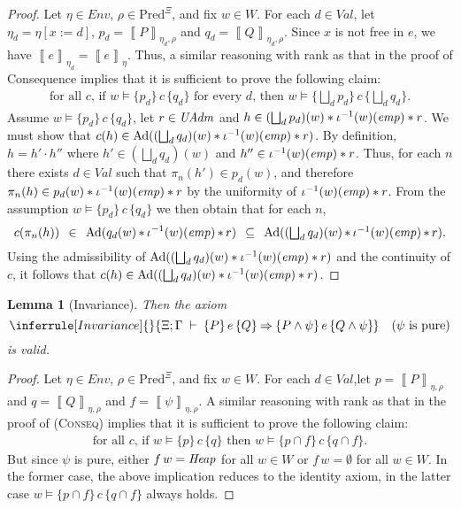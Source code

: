 \documentclass{LMCS}
\newtheorem{lemma}[theorem]{Lemma}
\theoremstyle{remark}
\newcommand{\Val}{\ensuremath{\mathit{Val}}\xspace}
\newcommand{\COMB}{\ensuremath{\cdot}}
\newcommand{\Env}{\ensuremath{\textit{Env}}\xspace}
\newcommand{\triple}[3]{{\ensuremath{\!\left.\{ #1 \}\, #2\, \{  #3 \}\!\right.}}}
\newcommand{\wemp}{\textnormal{\textit{emp}}}
\newcommand{\den}[1]{\left\llbracket #1
  \right\rrbracket}
\newcommand{\Pred}{\ensuremath{\mathrm{Pred}}\xspace}
\newcommand{\W}{\ensuremath{W}}
\newcommand{\UNFOLD}{\ensuremath{\iota^{-1}}}
\newcommand{\X}{\ensuremath{\Xi}}
\begin{document}
\begin{proof}
Let $\eta\in\Env$, $\rho\in\Pred^\X$, and fix $w\in\W$. 
For each $d\in\Val$, let $\eta_d = \eta[x{:=}d]$,  $p_d = \den{P}_{\eta_d,\rho}$ 
and $q_d = \den{Q}_{\eta_d,\rho}$.
Since $x$ is not free in $e$, we have 
$\den{e}_{\eta_d} = \den{e}_\eta$. Thus, a similar reasoning
with rank as that in the proof of Consequence implies that it is
sufficient to prove the following claim:
\begin{align*}
\textstyle{
\text{
for all $c$,
if $w\models\triple{p_d}{c}{q_d}$ for every $d$, then $w\models\triple{\bigsqcup_d p_d}{c}{\bigsqcup_d q_d}$} .
}
\end{align*}
Assume $w\models\triple{p_d}{c}{q_d}$, let $r\in\mathit{UAdm}$ and $h\in(\bigsqcup_d p_d)(w) * \UNFOLD(w)(\wemp) * r$. 
We must show that $c(h)\in\DCl( (\bigsqcup_d q_d)(w) * \UNFOLD(w)(\wemp) * r)$. 
By definition, $h = h'\COMB h''$ where $h'\in (\bigsqcup_d q_d)(w)$ and $h''\in \UNFOLD(w)(\wemp) * r$. 
Thus, for each $n$ there exists $d\in\Val$ such that $\pi_n(h')\in p_d(w)$, and therefore 
$\pi_n(h)\in p_d(w) *   \UNFOLD(w)(\wemp) * r$ by the uniformity of $\UNFOLD(w)(\wemp) * r$. 
From the assumption $w\models\triple{p_d}{c}{q_d}$ we then obtain 
that for each $n$, 
\[
c(\pi_n(h)) \,\;\in\;\, \DCl( q_d(w) \,{*}\,   \UNFOLD(w)(\wemp) \,{*}\, r)
            \,\;\subseteq\;\, \DCl( (\textstyle{\bigsqcup_d q_d})(w) \,{*}\, \UNFOLD(w)(\wemp) \,{*}\, r). 
\] 
Using the admissibility of $\DCl((\bigsqcup_d q_d)(w) *   \UNFOLD(w)(\wemp) * r)$ and the continuity of $c$, it follows that $c(h)\in\DCl( (\bigsqcup_d q_d)(w) * \UNFOLD(w)(\wemp) * r)$. 
\end{proof}

\begin{lemma}[Invariance]
Then the  axiom 
\[\inferrule[Invariance]{}{
 \X;\Gamma \;\adash\; \triple{P}{e}{Q}
 \Rightarrow \triple{P\wedge \psi}{e}{Q \wedge \psi}
  } \mbox{\quad ($\psi$ is pure)}
\]is valid. 
\end{lemma}

\begin{proof} 
Let $\eta\in\Env$, $\rho\in\Pred^\X$, and fix $w\in\W$. 
For each $d\in\Val$,let $p= \den{P}_{\eta,\rho}$ 
and $q = \den{Q}_{\eta,\rho}$ and $f= \den{\psi}_{\eta,\rho}$.
A similar reasoning
with rank as that in the proof of (\textsc{Conseq}) implies that it is
sufficient to prove the following claim:
\begin{align*}
\textstyle{
\text{
for all $c$,
if $w\models\triple{p}{c}{q}$  then $w\models\triple{p\cap f}{c}{q\cap f}$} .
}
\end{align*}
But since  $\psi$ is pure, either $f\, w = \mathit{Heap}$ for all $w\in W$ or $f\, w = \emptyset$ for all $w\in W$.  In the former case, the above implication reduces to the identity axiom, in the latter case  
 $w\models\triple{p\cap f}{c}{q\cap f}$ always holds.
 \end{proof}
\end{document}
